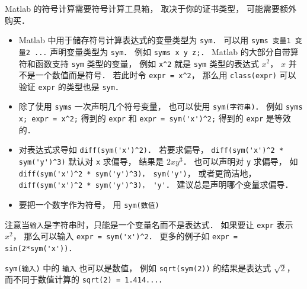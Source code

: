
Matlab 的符号计算需要符号计算工具箱， 取决于你的证书类型， 可能需要额外购买． 

\begin{itemize}
\item Matlab 中用于储存符号计算表达式的变量类型为 \verb|sym|． 可以用 \verb|syms 变量1 变量2 ...| 声明变量类型为 \verb|sym|． 例如 \verb|syms x y z;|． Matlab 的大部分自带算符和函数支持 \verb|sym| 类型的变量， 例如 \verb|x^2| 就是 \verb|sym| 类型的表达式 $x^2$， $x$ 并不是一个数值而是符号． 若此时令 \verb|expr = x^2|， 那么用 \verb|class(expr)| 可以验证 \verb|expr| 的类型也是 \verb|sym|．
\item 除了使用 \verb|syms| 一次声明几个符号变量， 也可以使用 \verb|sym(字符串)|． 例如 \verb|syms x; expr = x^2;| 得到的 \verb|expr| 和 \verb|expr = sym('x')^2;| 得到的 \verb|expr| 是等效的．
\item  对表达式求导如 \verb|diff(sym('x')^2)|． 若要求偏导， \verb|diff(sym('x')^2 * sym('y')^3)| 默认对 \verb|x| 求偏导， 结果是 $2x y^3$． 也可以声明对 \verb|y| 求偏导， 如 \verb|diff(sym('x')^2 * sym('y')^3)， sym('y')|， 或者更简洁地， \verb|diff(sym('x')^2 * sym('y')^3)， 'y'|． 建议总是声明哪个变量求偏导．
\item  要把一个数字作为符号， 用 \verb|sym(数值)|
\end{itemize}

注意当\verb|输入|是字符串时，只能是一个变量名而不是表达式． 如果要让 \verb|expr| 表示 $x^2$， 那么可以输入 \verb|expr = sym('x')^2|． 更多的例子如 \verb|expr = sin(2*sym('x'))|．

\verb|sym(输入)| 中的 \verb|输入| 也可以是数值， 例如 \verb|sqrt(sym(2))| 的结果是表达式 $\sqrt 2$， 而不同于数值计算的 \verb|sqrt(2) = 1.414...|．


